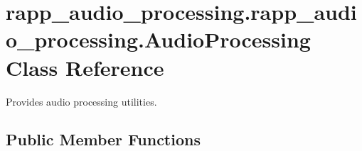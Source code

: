 \hypertarget{classrapp__audio__processing_1_1rapp__audio__processing_1_1AudioProcessing}{\section{rapp\-\_\-audio\-\_\-processing.\-rapp\-\_\-audio\-\_\-processing.\-Audio\-Processing Class Reference}
\label{classrapp__audio__processing_1_1rapp__audio__processing_1_1AudioProcessing}
}


Provides audio processing utilities.  


\subsection*{Public Member Functions}
